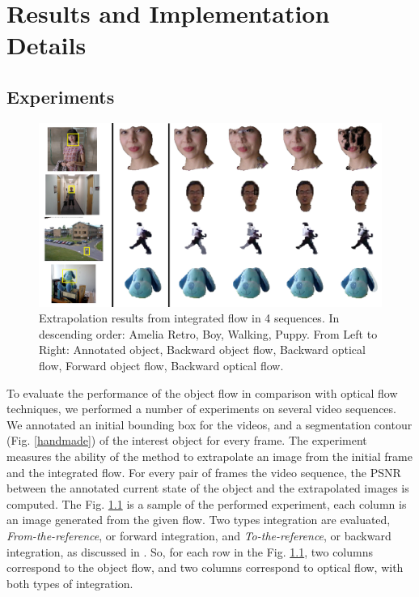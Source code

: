 \chapter{Results and Implementation Details} \label{chap:results}

\section{Experiments}

   \begin{figure}[th]
      \centering
      \includegraphics[width=1.0\textwidth]{../images/extrapolated.png}
      \caption{Extrapolation results from integrated flow in 4 sequences. In descending order: Amelia Retro, Boy, Walking, Puppy. From Left to Right: Annotated object, Backward object flow, Backward optical flow, Forward object flow, Backward optical flow.}
      \label{sample}
   \end{figure}

To evaluate the performance of the object flow in comparison with optical flow techniques, we performed 
a number of experiments on several video sequences. We annotated an initial bounding box for the videos, 
and a segmentation contour (Fig. \ref{handmade}) of the interest object for every frame. The experiment measures the ability of the method to 
extrapolate an image from the initial frame and the integrated flow. For every pair of frames the video sequence, the PSNR between the annotated
current state of the object and the extrapolated images is computed. The Fig. \ref{sample} is a sample of the performed experiment, each column is an image generated from the given flow. 
Two types integration are evaluated, {\it From-the-reference}, or forward integration, and {\it To-the-reference}, or backward integration, as discussed in \cite{c20}. So, for each row in the Fig. \ref{sample}, two columns correspond to the object flow, and two columns correspond to optical flow, with both types of integration.

